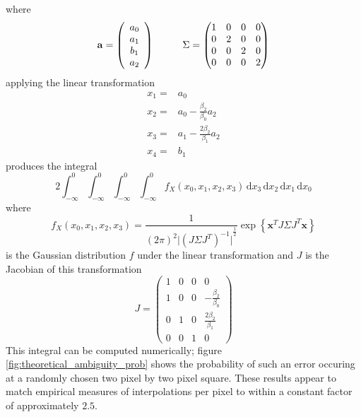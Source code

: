 \documentclass{report}
\newcommand{\xx}[0]{\mathbf{x}}
\newcommand{\ud}{\,\mathrm{d}}
\begin{document}
where
\[
{\bf a} = \left(
\begin{array}{c}
  a_{0} \\
  a_{1} \\
  b_{1} \\
  a_{2}
\end{array}
\right)
\hspace{1 cm}
\Sigma = \begin{pmatrix}
  1 & 0 & 0 & 0 \\
  0 & 2 & 0 & 0 \\
  0 & 0 & 2 & 0 \\
  0 & 0 & 0 & 2
\end{pmatrix}
\]
applying the linear transformation
\begin{align*}
  x_{1} = & a_{0} \\
  x_{2} = & a_{0} - \frac{\beta_{2}}{\beta_{0}} a_{2} \\
  x_{3} = & a_{1} - \frac{2 \beta_{2}}{\beta_{1}} a_{2} \\
  x_{4} = & b_{1}
\end{align*}
produces the integral
\begin{equation}
  \label{eq:theoretical_ambiguity_prob}
  2 \int_{-\infty}^{0} \int_{-\infty}^{0} \int_{-\infty}^{0} \int_{-\infty}^{0} f_{X}(x_{0}, x_{1}, x_{2}, x_{3}) \ud{x_{3}} \ud{x_{2}} \ud{x_{1}} \ud{x_{0}}
\end{equation}
where
\[
f_{X}(x_{0}, x_{1}, x_{2}, x_{3}) = \frac{1}{(2 \pi)^{2} {\vert (J \Sigma J^{T})^{-1} \vert}^{\frac{1}{2}}} \exp{\left\{ \xx^{T} J \Sigma J^{T} \xx \right\}}
\]
is the Gaussian distribution $f$ under the linear transformation and $J$ is the Jacobian of this transformation
\[
J = \begin{pmatrix}
  1 & 0 & 0 & 0 \\
  1 & 0 & 0 & -\frac{\beta_{2}}{\beta_{0}} \\ 
  0 & 1 & 0 & \frac{2 \beta_{2}}{\beta_{1}} \\
  0 & 0 & 1 & 0
\end{pmatrix}
\]
This integral can be computed numerically; figure \ref{fig:theoretical_ambiguity_prob} shows the probability of such an error occuring at a randomly chosen two pixel by two pixel square. These results appear to match empirical measures of interpolations per pixel to within a constant factor of approximately $2.5$. %
\end{document}
